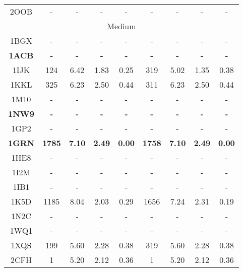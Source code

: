 \begin{longtable}{c c c c c|c c c c}
 {\tiny 2OOB} &{\tiny -}&{\tiny -}&{\tiny -}&{\tiny -} &{\tiny -}&{\tiny -}&{\tiny -}&{\tiny -}\\ 
 \multicolumn{9}{c}{Medium}\\
{\tiny 1BGX} &{\tiny -}&{\tiny -}&{\tiny -}&{\tiny -} &{\tiny -}&{\tiny -}&{\tiny -}&{\tiny -}\\ 
 \textbf{\tiny 1ACB} &\textbf{\tiny -}&\textbf{\tiny -}&\textbf{\tiny -}&\textbf{\tiny -} &\textbf{\tiny -}&\textbf{\tiny -}&\textbf{\tiny -}&\textbf{\tiny -}\\ 
 {\tiny 1IJK} &{\tiny 124}&{\tiny 6.42}&{\tiny 1.83}&{\tiny 0.25} &{\tiny 319}&{\tiny 5.02}&{\tiny 1.35}&{\tiny 0.38}\\ 
 {\tiny 1KKL} &{\tiny 325}&{\tiny 6.23}&{\tiny 2.50}&{\tiny 0.44} &{\tiny 311}&{\tiny 6.23}&{\tiny 2.50}&{\tiny 0.44}\\ 
 {\tiny 1M10} &{\tiny -}&{\tiny -}&{\tiny -}&{\tiny -} &{\tiny -}&{\tiny -}&{\tiny -}&{\tiny -}\\ 
 \textbf{\tiny 1NW9} &\textbf{\tiny -}&\textbf{\tiny -}&\textbf{\tiny -}&\textbf{\tiny -} &\textbf{\tiny -}&\textbf{\tiny -}&\textbf{\tiny -}&\textbf{\tiny -}\\ 
 {\tiny 1GP2} &{\tiny -}&{\tiny -}&{\tiny -}&{\tiny -} &{\tiny -}&{\tiny -}&{\tiny -}&{\tiny -}\\ 
 \textbf{\tiny 1GRN} &\textbf{\tiny 1785}&\textbf{\tiny 7.10}&\textbf{\tiny 2.49}&\textbf{\tiny 0.00} &\textbf{\tiny 1758}&\textbf{\tiny 7.10}&\textbf{\tiny 2.49}&\textbf{\tiny 0.00}\\ 
 {\tiny 1HE8} &{\tiny -}&{\tiny -}&{\tiny -}&{\tiny -} &{\tiny -}&{\tiny -}&{\tiny -}&{\tiny -}\\ 
 {\tiny 1I2M} &{\tiny -}&{\tiny -}&{\tiny -}&{\tiny -} &{\tiny -}&{\tiny -}&{\tiny -}&{\tiny -}\\ 
 {\tiny 1IB1} &{\tiny -}&{\tiny -}&{\tiny -}&{\tiny -} &{\tiny -}&{\tiny -}&{\tiny -}&{\tiny -}\\ 
 {\tiny 1K5D} &{\tiny 1185}&{\tiny 8.04}&{\tiny 2.03}&{\tiny 0.29} &{\tiny 1656}&{\tiny 7.24}&{\tiny 2.31}&{\tiny 0.19}\\ 
 {\tiny 1N2C} &{\tiny -}&{\tiny -}&{\tiny -}&{\tiny -} &{\tiny -}&{\tiny -}&{\tiny -}&{\tiny -}\\ 
 {\tiny 1WQ1} &{\tiny -}&{\tiny -}&{\tiny -}&{\tiny -} &{\tiny -}&{\tiny -}&{\tiny -}&{\tiny -}\\ 
 {\tiny 1XQS} &{\tiny 199}&{\tiny 5.60}&{\tiny 2.28}&{\tiny 0.38} &{\tiny 319}&{\tiny 5.60}&{\tiny 2.28}&{\tiny 0.38}\\ 
 {\tiny 2CFH} &{\tiny 1}&{\tiny 5.20}&{\tiny 2.12}&{\tiny 0.36} &{\tiny 1}&{\tiny 5.20}&{\tiny 2.12}&{\tiny 0.36}\\ 

\end{longtable}
